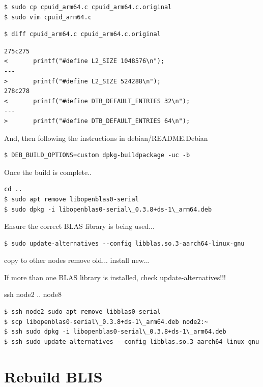 \documentclass{report}
\begin{document}
\lstset{style=type}
\begin{lstlisting}
$ sudo cp cpuid_arm64.c cpuid_arm64.c.original
$ sudo vim cpuid_arm64.c
\end{lstlisting}


\lstset{style=type}
\begin{lstlisting}
$ diff cpuid_arm64.c cpuid_arm64.c.original
\end{lstlisting}

\lstset{style=type}
\begin{lstlisting}
275c275
<       printf("#define L2_SIZE 1048576\n");
---
>       printf("#define L2_SIZE 524288\n");
278c278
<       printf("#define DTB_DEFAULT_ENTRIES 32\n");
---
>       printf("#define DTB_DEFAULT_ENTRIES 64\n");
\end{lstlisting}


And, then following the instructions in debian/README.Debian

\lstset{style=type}
\begin{lstlisting}
$ DEB_BUILD_OPTIONS=custom dpkg-buildpackage -uc -b
\end{lstlisting}

Once the build is complete..

\lstset{style=type}
\begin{lstlisting}
cd ..
$ sudo apt remove libopenblas0-serial
$ sudo dpkg -i libopenblas0-serial\_0.3.8+ds-1\_arm64.deb
\end{lstlisting}

Ensure the correct BLAS library is being used...

\lstset{style=type}
\begin{lstlisting}
$ sudo update-alternatives --config libblas.so.3-aarch64-linux-gnu
\end{lstlisting}

copy to other nodes
remove old...
install new...

If more than one BLAS library is installed, check update-alternatives!!!

ssh node2 .. node8
\lstset{style=type}
\begin{lstlisting}
$ ssh node2 sudo apt remove libblas0-serial
$ scp libopenblas0-serial\_0.3.8+ds-1\_arm64.deb node2:~
$ ssh sudo dpkg -i libopenblas0-serial\_0.3.8+ds-1\_arm64.deb
$ ssh sudo update-alternatives --config libblas.so.3-aarch64-linux-gnu
\end{lstlisting}


%
%
\chapter{Rebuild BLIS}
\end{document}
